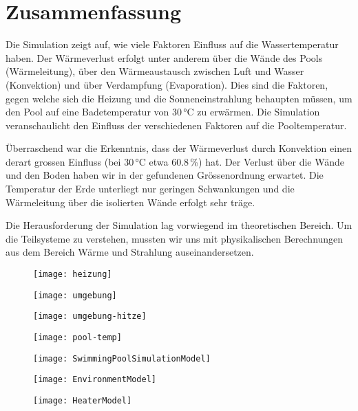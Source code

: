 \section{Zusammenfassung}
\label{sec:Zusammenfassung}
Die Simulation zeigt auf, wie viele Faktoren Einfluss auf die Wassertemperatur haben. Der Wärmeverlust erfolgt unter anderem über die Wände des Pools (Wärmeleitung), über den Wärmeaustausch zwischen Luft und Wasser (Konvektion) und über Verdampfung (Evaporation). Dies sind die Faktoren, gegen welche sich die Heizung und die Sonneneinstrahlung behaupten müssen, um den Pool auf eine Badetemperatur von 30\,°C zu erwärmen. Die Simulation veranschaulicht den Einfluss der verschiedenen Faktoren auf die Pooltemperatur.

Überraschend war die Erkenntnis, dass der Wärmeverlust durch Konvektion einen derart grossen Einfluss (bei 30\,°C etwa 60.8\,\%) hat. Der Verlust über die Wände und den Boden haben wir in der gefundenen Grössenordnung erwartet. Die Temperatur der Erde unterliegt nur geringen Schwankungen und die Wärmeleitung über die isolierten Wände erfolgt sehr träge.

Die Herausforderung der Simulation lag vorwiegend im theoretischen Bereich. Um die Teilsysteme zu verstehen, mussten wir uns mit physikalischen Berechnungen aus dem Bereich Wärme und Strahlung auseinandersetzen.


\begin{figure}[H]
	\centering
	\texttt{[image: heizung]}
	\caption{}
	\label{fig:heizung}
\end{figure}

\begin{figure}[H]
	\centering
	\texttt{[image: umgebung]}
	\caption{}
	\label{fig:umgebung}
\end{figure}

\begin{figure}[H]
	\centering
	\texttt{[image: umgebung-hitze]}
	\caption{}
	\label{fig:umgebung-hitze}
\end{figure}

\begin{figure}[H]
	\centering
	\texttt{[image: pool-temp]}
	\caption{}
	\label{fig:pool-temp}
\end{figure}

\begin{figure}[H]
	\centering
	\texttt{[image: SwimmingPoolSimulationModel]}
	\caption{}
	\label{fig:SwimmingPoolSimulationModel}
\end{figure}
\begin{figure}[H]
	\centering
	\texttt{[image: EnvironmentModel]}
	\caption{}
	\label{fig:EnvironmentModel}
\end{figure}

\begin{figure}[H]
	\centering
	\texttt{[image: HeaterModel]}
	\caption{}
	\label{fig:HeaterModel}
\end{figure}


